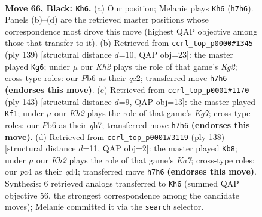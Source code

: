\documentclass[11pt]{article}
\begin{document}
\clearpage

\begin{figure}[p]\centering
\begin{subfigure}{0.46\textwidth}\centering
\resizebox{\linewidth}{!}{%
\newchessgame
\chessboard[
  setfen={8/7k/pp6/8/q1P5/3K4/8/8 b - - 1 66},
  showmover=false,
  pgfstyle=straightmove, color=movearrow, markmove={h7-h6}
]}
\caption{}
\end{subfigure}\hfill
\begin{subfigure}{0.46\textwidth}\centering
\resizebox{\linewidth}{!}{%
\newchessgame
\chessboard[
  setfen={8/6k1/8/8/5q1p/8/4QPK1/8 b - - 7 70},
  showmover=false,
  pgfstyle=straightmove, color=movearrow, markmove={g7-g6}
]}
\caption{}
\end{subfigure}
\\[4pt]
\begin{subfigure}{0.46\textwidth}\centering
\resizebox{\linewidth}{!}{%
\newchessgame
\chessboard[
  setfen={8/7Q/1K6/p7/8/1Pq5/6k1/8 b - - 3 72},
  showmover=false,
  pgfstyle=straightmove, color=movearrow, markmove={g2-f1}
]}
\caption{}
\end{subfigure}\hfill
\begin{subfigure}{0.46\textwidth}\centering
\resizebox{\linewidth}{!}{%
\newchessgame
\chessboard[
  setfen={8/K7/8/P7/3q4/Q4p2/8/5k2 w - - 6 70},
  showmover=false,
  pgfstyle=straightmove, color=movearrow, markmove={a7-b8}
]}
\caption{}
\end{subfigure}
\caption{\textbf{Move 66, Black: \texttt{Kh6}.} (a) Our position; Melanie plays \texttt{Kh6} (\texttt{h7h6}). Panels (b)--(d) are the retrieved master positions whose correspondence most drove this move (highest QAP objective among those that transfer to it). (b) Retrieved from \texttt{ccrl\_top\_p0000\#1345} (ply 139) [structural distance $d$=10, QAP obj=23]: the master played \texttt{Kg6}; under $\mu$ our \emph{Kh2} plays the role of that game's \emph{Kg2}; cross-type roles: our \emph{P}b6 as their \emph{q}e2; transferred move \texttt{h7h6} \textbf{(endorses this move)}. (c) Retrieved from \texttt{ccrl\_top\_p0001\#1170} (ply 143) [structural distance $d$=9, QAP obj=13]: the master played \texttt{Kf1}; under $\mu$ our \emph{Kh2} plays the role of that game's \emph{Kg7}; cross-type roles: our \emph{P}b6 as their \emph{q}h7; transferred move \texttt{h7h6} \textbf{(endorses this move)}. (d) Retrieved from \texttt{ccrl\_top\_p0001\#3119} (ply 138) [structural distance $d$=11, QAP obj=2]: the master played \texttt{Kb8}; under $\mu$ our \emph{Kh2} plays the role of that game's \emph{Ka7}; cross-type roles: our \emph{p}c4 as their \emph{q}d4; transferred move \texttt{h7h6} \textbf{(endorses this move)}. Synthesis: 6 retrieved analogs transferred to \texttt{Kh6} (summed QAP objective 56, the strongest correspondence among the candidate moves); Melanie committed it via the \texttt{search} selector.}
\label{fig:thought-m131}
\end{figure}
\end{document}
